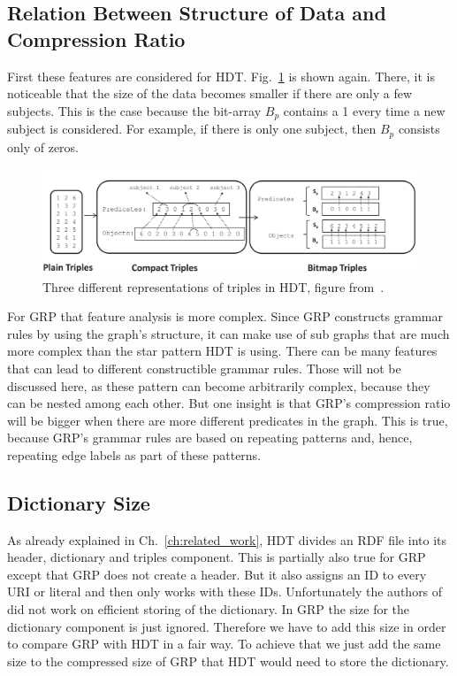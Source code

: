 \subsection{Relation Between Structure of Data and Compression Ratio}\label{sec:relationDataStructureComprRatio}

First these features are considered for HDT. Fig.~\ref{fig:hdt_overview_1} is shown again. There, it is noticeable that the size of the data becomes smaller if there are only a few subjects. This is the case because the bit-array $B_p$ contains a 1 every time a new subject is considered. For example, if there is only one subject, then $B_p$ consists only of zeros.

\begin{figure}[h]
	\centering
	\includegraphics[width=1\textwidth]{figures/relatedwork/hdt1}
	\caption{Three different representations of triples in HDT, figure from~\cite{hdt}.}
	\label{fig:hdt_overview_1}
\end{figure}

For GRP that feature analysis is more complex. Since GRP constructs grammar rules by using the graph's structure, it can make use of sub graphs that are much more complex than the star pattern HDT is using. There can be many features that can lead to different constructible grammar rules. Those will not be discussed here, as these pattern can become arbitrarily complex, because they can be nested among each other. But one insight is that GRP's compression ratio will be bigger when there are more different predicates in the graph. This is true, because GRP's grammar rules are based on repeating patterns and, hence, repeating edge labels as part of these patterns.

\subsection{Dictionary Size}


As already explained in Ch.~\ref{ch:related_work}, HDT divides an RDF file into its header, dictionary and triples component. This is partially also true for GRP except that GRP does not create a header. But it also assigns an ID to every URI or literal and then only works with these IDs. Unfortunately the authors of~\cite{maneth} did not work on efficient storing of the dictionary. In GRP the size for the dictionary component is just ignored. Therefore we have to add this size in order to compare GRP with HDT in a fair way. To achieve that we just add the same size to the compressed size of GRP that HDT would need to store the dictionary.


